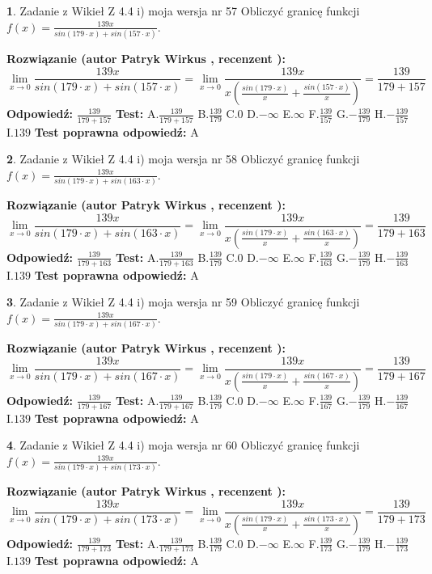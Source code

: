 \documentclass[12pt, a4paper]{article}
\theoremstyle{definition} %
\newtheorem{zad}{}
\newcommand{\zadStart}[1]{\begin{zad}#1\newline}
\newcommand{\zadStop}{\end{zad}}
\newcommand{\rozwStart}[2]{\noindent \textbf{Rozwiązanie (autor #1 , recenzent #2): }\newline}
\newcommand{\rozwStop}{\newline}
\newcommand{\odpStart}{\noindent \textbf{Odpowiedź:}\newline}
\newcommand{\odpStop}{\newline}
\newcommand{\testStart}{\noindent \textbf{Test:}\newline}
\newcommand{\testStop}{\newline}
\newcommand{\kluczStart}{\noindent \textbf{Test poprawna odpowiedź:}\newline}
\newcommand{\kluczStop}{\newline}
\begin{document}
\zadStart{Zadanie z Wikieł Z 4.4 i) moja wersja nr 57}
Obliczyć granicę funkcji $f(x)=\frac{139x}{sin(179\cdot x) +sin(157\cdot x)}$.
\zadStop
\rozwStart{Patryk Wirkus}{}
$$\lim\limits_{x\to 0}\frac{139x}{sin(179\cdot x) +sin(157\cdot x)}=\lim\limits_{x\to 0}\frac{139x}{x(\frac{sin(179\cdot x)}{x}+\frac{sin(157\cdot x)}{x})}=\frac{139}{179+157}$$
\rozwStop
\odpStart
$\frac{139}{179+157}$
\odpStop
\testStart
A.$\frac{139}{179+157}$
B.$\frac{139}{179}$
C.$0$
D.$-\infty$
E.$\infty$
F.$\frac{139}{157}$
G.$-\frac{139}{179}$
H.$-\frac{139}{157}$
I.$139$
\testStop
\kluczStart
A
\kluczStop



\zadStart{Zadanie z Wikieł Z 4.4 i) moja wersja nr 58}
Obliczyć granicę funkcji $f(x)=\frac{139x}{sin(179\cdot x) +sin(163\cdot x)}$.
\zadStop
\rozwStart{Patryk Wirkus}{}
$$\lim\limits_{x\to 0}\frac{139x}{sin(179\cdot x) +sin(163\cdot x)}=\lim\limits_{x\to 0}\frac{139x}{x(\frac{sin(179\cdot x)}{x}+\frac{sin(163\cdot x)}{x})}=\frac{139}{179+163}$$
\rozwStop
\odpStart
$\frac{139}{179+163}$
\odpStop
\testStart
A.$\frac{139}{179+163}$
B.$\frac{139}{179}$
C.$0$
D.$-\infty$
E.$\infty$
F.$\frac{139}{163}$
G.$-\frac{139}{179}$
H.$-\frac{139}{163}$
I.$139$
\testStop
\kluczStart
A
\kluczStop



\zadStart{Zadanie z Wikieł Z 4.4 i) moja wersja nr 59}
Obliczyć granicę funkcji $f(x)=\frac{139x}{sin(179\cdot x) +sin(167\cdot x)}$.
\zadStop
\rozwStart{Patryk Wirkus}{}
$$\lim\limits_{x\to 0}\frac{139x}{sin(179\cdot x) +sin(167\cdot x)}=\lim\limits_{x\to 0}\frac{139x}{x(\frac{sin(179\cdot x)}{x}+\frac{sin(167\cdot x)}{x})}=\frac{139}{179+167}$$
\rozwStop
\odpStart
$\frac{139}{179+167}$
\odpStop
\testStart
A.$\frac{139}{179+167}$
B.$\frac{139}{179}$
C.$0$
D.$-\infty$
E.$\infty$
F.$\frac{139}{167}$
G.$-\frac{139}{179}$
H.$-\frac{139}{167}$
I.$139$
\testStop
\kluczStart
A
\kluczStop



\zadStart{Zadanie z Wikieł Z 4.4 i) moja wersja nr 60}
Obliczyć granicę funkcji $f(x)=\frac{139x}{sin(179\cdot x) +sin(173\cdot x)}$.
\zadStop
\rozwStart{Patryk Wirkus}{}
$$\lim\limits_{x\to 0}\frac{139x}{sin(179\cdot x) +sin(173\cdot x)}=\lim\limits_{x\to 0}\frac{139x}{x(\frac{sin(179\cdot x)}{x}+\frac{sin(173\cdot x)}{x})}=\frac{139}{179+173}$$
\rozwStop
\odpStart
$\frac{139}{179+173}$
\odpStop
\testStart
A.$\frac{139}{179+173}$
B.$\frac{139}{179}$
C.$0$
D.$-\infty$
E.$\infty$
F.$\frac{139}{173}$
G.$-\frac{139}{179}$
H.$-\frac{139}{173}$
I.$139$
\testStop
\kluczStart
A
\kluczStop
\end{document}
